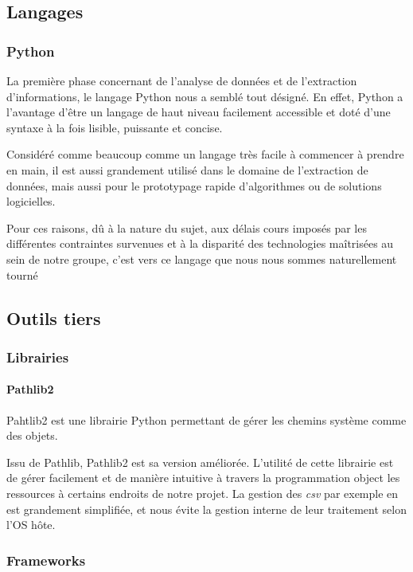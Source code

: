 \documentclass{article}
\begin{document}
\subsection{Langages}

\subsubsection{Python}

La première phase concernant de l'analyse de données et de l'extraction d'informations, le langage Python nous a semblé tout désigné.
En effet, Python a l'avantage d'être un langage de haut niveau facilement accessible et doté d'une syntaxe à la fois lisible, puissante et concise.

Considéré comme beaucoup comme un langage très facile à commencer à prendre en main, il est aussi grandement utilisé dans le domaine de l'extraction de données, mais aussi pour le prototypage rapide d'algorithmes ou de solutions logicielles.

Pour ces raisons, dû à la nature du sujet, aux délais cours imposés par les différentes contraintes survenues et à la disparité des technologies maîtrisées au sein de notre groupe, c'est vers ce langage que nous nous sommes naturellement tourné

\subsection{Outils tiers}

\subsubsection{Librairies}

\paragraph{Pathlib2}

Pahtlib2 est une librairie Python permettant de gérer les chemins système comme des objets.

Issu de Pathlib, Pathlib2 est sa version améliorée.
L'utilité de cette librairie est de gérer facilement et de manière intuitive à travers la programmation object les ressources à certains endroits de notre projet.
La gestion des \textit{csv} par exemple en est grandement simplifiée, et nous évite la gestion interne de leur traitement selon l'OS hôte.

\subsubsection{Frameworks}
\end{document}
